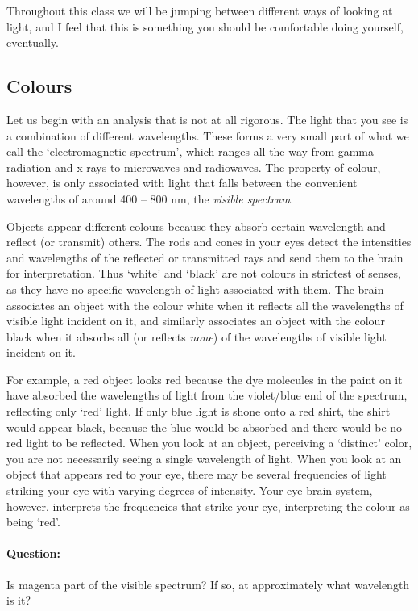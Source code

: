 Throughout this class we will be jumping between different ways of looking at light, and I feel that this is something you should be comfortable doing yourself, eventually.

\subsection{Colours}

Let us begin with an analysis that is not at all rigorous. The light that you see is a combination of different wavelengths. These forms a very small part of what we call the `electromagnetic spectrum', which ranges all the way from gamma radiation and x-rays to microwaves and radiowaves. The property of colour, however, is only associated with light that falls between the convenient wavelengths of around 400 -- 800 nm, the \textit{visible spectrum}.

Objects appear different colours because they absorb certain wavelength and reflect (or transmit) others. The rods and cones in your eyes detect the intensities and wavelengths of the reflected or transmitted rays and send them to the brain for interpretation. Thus `white' and `black' are not colours in strictest of senses, as they have no specific wavelength of light associated with them. The brain associates an object with the colour white when it reflects all the wavelengths of visible light incident on it, and similarly associates an object with the colour black when it absorbs all (or reflects \textit{none}) of the wavelengths of visible light incident on it. 

For example, a red object looks red because the dye molecules in the paint on it have absorbed the wavelengths of light from the violet/blue end of the spectrum, reflecting only `red' light. If only blue light is shone onto a red shirt, the shirt would appear black, because the blue would be absorbed and there would be no red light to be reflected. When you look at an object, perceiving a `distinct' color, you are not necessarily seeing a single wavelength of light. When you look at an object that appears red to your eye, there may be several frequencies of light striking your eye with varying degrees of intensity. Your eye-brain system, however, interprets the frequencies that strike your eye, interpreting the colour as being `red'.

\begin{tcolorbox}
\paragraph{Question: } Is magenta part of the visible spectrum? If so, at approximately what wavelength is it?
\end{tcolorbox}

